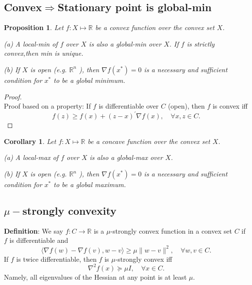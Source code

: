 \documentclass[11pt,a4paper]{article}
\newtheorem{proposition}{Proposition}
\newtheorem{corollary}{Corollary}
\begin{document}
\subsection{Convex$\Rightarrow$Stationary point is global-min}
\begin{proposition}
    Let $f: X \longmapsto \mathbb{R}$ be a convex function over the convex set $X$.

    (a) A local-min of $f$ over $X$ is also a global-min over $X$. If $f$ is strictly convex,then min is unique.

    (b) If $X$ is open (e.g. $\mathbb{R}^{n}$ ), then $\nabla f\left(x^{*}\right)=0$ is a necessary and sufficient condition for $x^{*}$ to be a global minimum.
\end{proposition}
\begin{proof}
\quad\\
Proof based on a property: If $f$ is differentiable over $C$ (open), then $f$ is convex iff
$$
f(z) \geq f(x)+(z-x)^{\prime} \nabla f(x), \quad \forall x, z \in C .
$$
\end{proof}














\begin{corollary}
    Let $f: X \longmapsto \mathbb{R}$ be a concave function over the convex set $X$.

    (a) A local-max of $f$ over $X$ is also a global-max over $X$.

    (b) If $X$ is open (e.g. $\mathbb{R}^{n}$ ), then $\nabla f\left(x^{*}\right)=0$ is a necessary and sufficient condition for $x^{*}$ to be a global maximum.
\end{corollary}


\subsection{$\mu-$strongly convexity}
\textbf{Definition}: We say $f: C \rightarrow \mathbb{R}$ is a $\mu$-strongly convex function in a convex set $C$ if $f$ is differentiable and
$$
\langle\nabla f(w)-\nabla f(v), w-v\rangle \geq \mu\|w-v\|^{2}, \quad \forall w, v \in C .
$$
If $f$ is twice differentiable, then $f$ is $\mu$-strongly convex iff
$$
\nabla^{2} f(x) \succeq \mu I, \quad \forall x \in C .
$$
Namely, all eigenvalues of the Hessian at any point is at least $\mu$.
\end{document}
